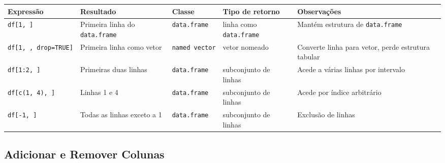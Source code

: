 \documentclass[
]{book}
\begin{document}
\begin{longtable}[]{@{}
  >{\raggedright\arraybackslash}p{}
  >{\raggedright\arraybackslash}p{}
  >{\raggedright\arraybackslash}p{}
  >{\raggedright\arraybackslash}p{}
  >{\raggedright\arraybackslash}p{}@{}}
\toprule\noalign{}
\begin{minipage}[b]{\linewidth}\raggedright
Expressão
\end{minipage} & \begin{minipage}[b]{\linewidth}\raggedright
Resultado
\end{minipage} & \begin{minipage}[b]{\linewidth}\raggedright
Classe
\end{minipage} & \begin{minipage}[b]{\linewidth}\raggedright
Tipo de retorno
\end{minipage} & \begin{minipage}[b]{\linewidth}\raggedright
Observações
\end{minipage} \\
\midrule\noalign{}
\endhead
\bottomrule\noalign{}
\endlastfoot
\texttt{df{[}1,\ {]}} & Primeira linha do \texttt{data.frame} & \texttt{data.frame} & linha como \texttt{data.frame} & Mantém estrutura de \texttt{data.frame} \\
\texttt{df{[}1,\ ,\ drop=TRUE{]}} & Primeira linha como vetor & \texttt{named\ vector} & vetor nomeado & Converte linha para vetor, perde estrutura tabular \\
\texttt{df{[}1:2,\ {]}} & Primeiras duas linhas & \texttt{data.frame} & subconjunto de linhas & Acede a várias linhas por intervalo \\
\texttt{df{[}c(1,\ 4),\ {]}} & Linhas 1 e 4 & \texttt{data.frame} & subconjunto de linhas & Acede por índice arbitrário \\
\texttt{df{[}-1,\ {]}} & Todas as linhas exceto a 1 & \texttt{data.frame} & subconjunto de linhas & Exclusão de linhas \\
\end{longtable}

\subsection{Adicionar e Remover Colunas}\label{adicionar-e-remover-colunas}
\end{document}
